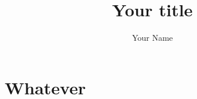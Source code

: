 \documentclass[a4paper,bibtotoc]{scrartcl}
\author{Your Name}
\title{Your title}
\begin{document}
\maketitle
\section{Whatever}
\end{document}
